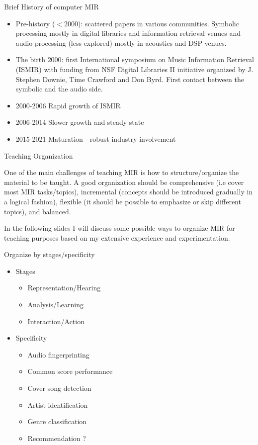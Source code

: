 \documentclass[12pt]{beamer}
\begin{document}
\begin{frame}{Brief History of computer MIR}
\begin{itemize} 
\item{Pre-history ($<2000$): scattered papers in various communities. Symbolic 
processing mostly in digital libraries and information retrieval venues 
and audio processing (less explored) mostly in acoustics and DSP venues.}
\item{The birth $2000$: first International symposium on Music Information 
Retrieval (ISMIR) with funding from NSF Digital Libraries II initiative 
organized by J. Stephen Downie, Time Crawford and Don Byrd. First contact between the symbolic and the audio side.}
\item{2000-2006} Rapid growth of ISMIR 
\item{2006-2014} Slower growth and steady state
\item{2015-2021} Maturation - robust industry involvement
\end{itemize} 
\end{frame}


\begin{frame}{Teaching Organization}

  One of the main challenges of teaching MIR is how to
  structure/organize the material to be taught. A good organization
  should be comprehensive (i.e cover most MIR tasks/topics),
  incremental (concepts should be introduced gradually in a logical
  fashion), flexible (it should be possible to emphasize or skip
  different topics), and balanced.

  In the following slides I will discuss some possible ways to
  organize MIR for teaching purposes based on my extensive experience
  and experimentation.
  

\end{frame} 

\begin{frame}{Organize by stages/specificity} 
\begin{itemize}
\item{Stages}
\begin{itemize} 
\item{Representation/Hearing} 
\item{Analysis/Learning}
\item{Interaction/Action}
\end{itemize}
\item{Specificity} 
\begin{itemize} 
\item{Audio fingerprinting} 
\item{Common score performance} 
\item{Cover song detection} 
\item{Artist identification} 
\item{Genre classification} 
\item{Recommendation ? } 
\end{itemize} 
\end{itemize}
\end{frame} 
\end{document}
